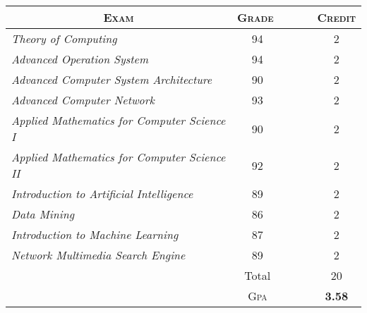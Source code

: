 \documentclass[10pt,a4paper,roman]{moderncv} %
\begin{document}
\begin{small}
\begin{center}
\begin{tabular}{lcc}
\multicolumn{1}{c}{\textsc{Exam}}&{\textsc{Grade~~~~~}}&{\textsc{Credit}}\\ \hline
\emph{Theory of Computing}                      	&94~~~~~&	2\\
\emph{Advanced Operation System}                   &94~~~~~&	2\\
\emph{Advanced Computer System Architecture}       &90~~~~~&	2\\
\emph{Advanced Computer Network}                   &93~~~~~&	2\\
\emph{Applied Mathematics for Computer Science I}	&90~~~~~&	2\\
\emph{Applied Mathematics for Computer Science II}	&92~~~~~&	2\\
\emph{Introduction to Artificial Intelligence}	    &89~~~~~&	2\\
\emph{Data Mining}	                                &86~~~~~&	2\\
\emph{Introduction to Machine Learning}	        &87~~~~~&	2\\
\emph{Network Multimedia Search Engine}	        &89~~~~~&	2\\
		& Total~~~~~&20\\\cline{2-3}
&\textsc{Gpa~~~~~}&\textbf{3.58}
\end{tabular}
\end{center}
\end{small}


%
%
%

\end{document}
